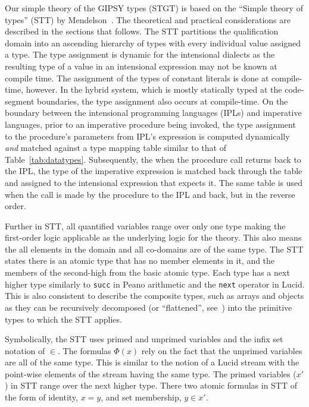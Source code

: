 \documentclass{easychair}
\newcommand{\xt}[1]{Table~\ref{#1}}
\newcommand{\ipl}{{IPL\index{IPL}}}
\newcommand{\lucid}{{Lucid\index{Lucid}}}
\newcommand{\api}[1]{\texttt{#1}\index{API!#1}}
\begin{document}
Our simple theory of the GIPSY types (STGT) is based on the
``Simple theory of types'' (STT) by Mendelson~\cite{math-logic-97}.
The theoretical and practical considerations are described in the sections
that follows. The STT partitions the qualification domain into
an ascending hierarchy of types with every individual
value assigned a type. The type assignment is dynamic
for the intensional dialects as the resulting type of
a value in an intensional expression may not be known
at compile time. The assignment of the types of constant literals
is done at compile-time, however. In the hybrid system,
which is mostly statically typed at the code-segment boundaries, the type assignment
also occurs at compile-time. On the boundary between the
intensional programming languages ({\ipl}s) and imperative languages, prior to an imperative procedure
being invoked, the type assignment to the procedure's parameters
from IPL's expression is computed dynamically {\em and} matched
against a type mapping table similar to that of \xt{tab:datatypes}.
Subsequently, the when the procedure call returns back to the IPL,
the type of the imperative expression is matched back through
the table and assigned to the intensional expression that expects it.
The same table is used when the call is made by the procedure
to the IPL and back, but in the reverse order.

Further in STT, all quantified
variables range over only one type making the first-order logic
applicable as the underlying logic for the theory. This also means
the all elements in the domain and all co-domains are of the same
type. The STT states there is an atomic type that has no member
elements in it, and the members of the second-high from the
basic atomic type. Each type has a next higher type similarly
to \api{succ} in Peano arithmetic and the \api{next} operator
in {\lucid}. This is also consistent to describe the composite
types, such as arrays and objects as they can be recursively
decomposed (or ``flattened'', see~\cite{mokhovmcthesis05}) into the primitive
types to which the STT applies.

Symbolically, the STT uses primed and unprimed variables and the
infix set notation of $\in$. The formulas $\Phi(x)$ rely on the
fact that the unprimed variables are all of the same type. This
is similar to the notion of a Lucid stream with the point-wise
elements of the stream having the same type. The primed variables ($x'$)
in STT range over the next higher type. There two atomic formulas
in STT of the form of identity, $x=y$, and set membership, $y \in x'$.
\end{document}
